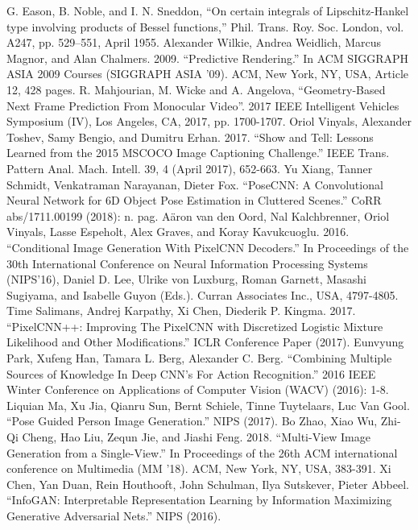 \documentclass[conference]{IEEEtran}
\begin{document}
\begin{thebibliography}{13}
 G. Eason, B. Noble, and I. N. Sneddon, ``On certain integrals of Lipschitz-Hankel type involving products of Bessel functions,'' Phil. Trans. Roy. Soc. London, vol. A247, pp. 529--551, April 1955.
 Alexander Wilkie, Andrea Weidlich, Marcus Magnor, and Alan Chalmers. 2009. ``Predictive Rendering.'' In ACM SIGGRAPH ASIA 2009 Courses (SIGGRAPH ASIA '09). ACM, New York, NY, USA, Article 12, 428 pages.
 R. Mahjourian, M. Wicke and A. Angelova, ``Geometry-Based Next Frame Prediction From Monocular Video''. 2017 IEEE Intelligent Vehicles Symposium (IV), Los Angeles, CA, 2017, pp. 1700-1707.
 Oriol Vinyals, Alexander Toshev, Samy Bengio, and Dumitru Erhan. 2017. ``Show and Tell: Lessons Learned from the 2015 MSCOCO Image Captioning Challenge.'' IEEE Trans. Pattern Anal. Mach. Intell. 39, 4 (April 2017), 652-663.
 Yu Xiang, Tanner Schmidt, Venkatraman Narayanan, Dieter Fox. ``PoseCNN: A Convolutional Neural Network for 6D Object Pose Estimation in Cluttered Scenes.'' CoRR abs/1711.00199 (2018): n. pag.
 A\"{a}ron van den Oord, Nal Kalchbrenner, Oriol Vinyals, Lasse Espeholt, Alex Graves, and Koray Kavukcuoglu. 2016. ``Conditional Image Generation With PixelCNN Decoders.'' In Proceedings of the 30th International Conference on Neural Information Processing Systems (NIPS'16), Daniel D. Lee, Ulrike von Luxburg, Roman Garnett, Masashi Sugiyama, and Isabelle Guyon (Eds.). Curran Associates Inc., USA, 4797-4805.
 Time Salimans, Andrej Karpathy, Xi Chen, Diederik P. Kingma. 2017. ``PixelCNN++: Improving The PixelCNN with Discretized Logistic Mixture Likelihood and Other Modifications.'' ICLR Conference Paper (2017).
 Eunvyung Park, Xufeng Han, Tamara L. Berg, Alexander C. Berg. ``Combining Multiple Sources of Knowledge In Deep CNN's For Action Recognition.'' 2016 IEEE Winter Conference on Applications of Computer Vision (WACV) (2016): 1-8.
 Liquian Ma, Xu Jia, Qianru Sun, Bernt Schiele, Tinne Tuytelaars, Luc Van Gool. ``Pose Guided Person Image Generation.'' NIPS (2017).
 Bo Zhao, Xiao Wu, Zhi-Qi Cheng, Hao Liu, Zequn Jie, and Jiashi Feng. 2018. ``Multi-View Image Generation from a Single-View.'' In Proceedings of the 26th ACM international conference on Multimedia (MM '18). ACM, New York, NY, USA, 383-391.
 Xi Chen, Yan Duan, Rein Houthooft, John Schulman, Ilya Sutskever, Pieter Abbeel. ``InfoGAN: Interpretable Representation Learning by Information Maximizing Generative Adversarial Nets.'' NIPS (2016).

\end{thebibliography}
\end{document}
